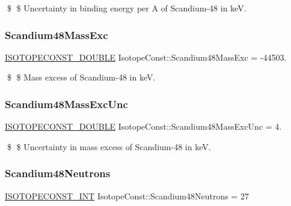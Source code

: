 \$ \$ Uncertainty in binding energy per A of Scandium-\/48 in keV. \mbox{\label{group___isotope_const-_scandium-_sc48_ga87f2b80ac32f5457a25d3e1066917e34}} 
\subsubsection{\texorpdfstring{Scandium48\+Mass\+Exc}{Scandium48MassExc}}
{\footnotesize\ttfamily \mbox{\hyperlink{group___isotope_const-_macros_ga8f45a7272ce02c0b4c65c44636ed719a}{I\+S\+O\+T\+O\+P\+E\+C\+O\+N\+S\+T\+\_\+\+D\+O\+U\+B\+LE}} Isotope\+Const\+::\+Scandium48\+Mass\+Exc = -\/44503.}

\$ \$ Mass excess of Scandium-\/48 in keV. \mbox{\label{group___isotope_const-_scandium-_sc48_gac5f5e44ecd383d9ef2b50af40ba31371}} 
\subsubsection{\texorpdfstring{Scandium48\+Mass\+Exc\+Unc}{Scandium48MassExcUnc}}
{\footnotesize\ttfamily \mbox{\hyperlink{group___isotope_const-_macros_ga8f45a7272ce02c0b4c65c44636ed719a}{I\+S\+O\+T\+O\+P\+E\+C\+O\+N\+S\+T\+\_\+\+D\+O\+U\+B\+LE}} Isotope\+Const\+::\+Scandium48\+Mass\+Exc\+Unc = 4.}

\$ \$ Uncertainty in mass excess of Scandium-\/48 in keV. \mbox{\label{group___isotope_const-_scandium-_sc48_ga47013b13dadf6c60e89cac7a027f2065}} 
\subsubsection{\texorpdfstring{Scandium48\+Neutrons}{Scandium48Neutrons}}
{\footnotesize\ttfamily \mbox{\hyperlink{group___isotope_const-_macros_ga5f18360b3e99483a35c32d789e62621c}{I\+S\+O\+T\+O\+P\+E\+C\+O\+N\+S\+T\+\_\+\+I\+NT}} Isotope\+Const\+::\+Scandium48\+Neutrons = 27}

